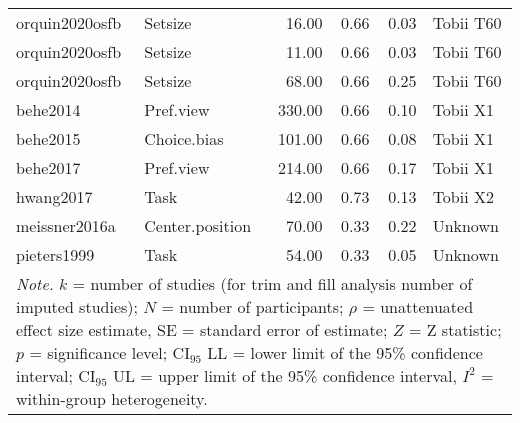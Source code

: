 \begin{table}[ht]
\begin{tabular}{llrrrl}
  orquin2020osfb & Setsize & 16.00 & 0.66 & 0.03 & Tobii T60 \\ 
  orquin2020osfb & Setsize & 11.00 & 0.66 & 0.03 & Tobii T60 \\ 
  orquin2020osfb & Setsize & 68.00 & 0.66 & 0.25 & Tobii T60 \\ 
  behe2014 & Pref.view & 330.00 & 0.66 & 0.10 & Tobii X1 \\ 
  behe2015 & Choice.bias & 101.00 & 0.66 & 0.08 & Tobii X1 \\ 
  behe2017 & Pref.view & 214.00 & 0.66 & 0.17 & Tobii X1 \\ 
  hwang2017 & Task & 42.00 & 0.73 & 0.13 & Tobii X2 \\ 
  meissner2016a & Center.position & 70.00 & 0.33 & 0.22 & Unknown \\ 
  pieters1999 & Task & 54.00 & 0.33 & 0.05 & Unknown \\ 
   \hline 
 \multicolumn{10}{p{0.95\textwidth}}{\scriptsize{\textit{Note.} $k$ = number of studies (for trim and fill analysis number of imputed studies); $N$ = number of participants; $\rho$ = unattenuated effect size estimate, SE = standard error of estimate; $Z$ = Z statistic; $p$ = significance level; $\textrm{CI}_{95}$ LL = lower limit of the 95\% confidence interval; $\textrm{CI}_{95}$ UL = upper limit of the 95\% confidence interval, $I^2$ = within-group heterogeneity.}} 
\end{tabular}
\endgroup
\end{table}

